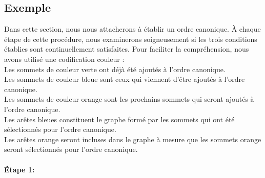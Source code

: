 \documentclass[hidelinks,letterpaper,12pt]{article}
\newcounter{Exemple} %
\begin{document}
\subsection{Exemple}
Dans cette section, nous nous attacherons à établir un ordre canonique. À chaque étape de cette procédure, nous examinerons soigneusement si les trois conditions établies sont continuellement satisfaites. Pour faciliter la compréhension, nous avons utilisé une codification couleur :
\\	
Les sommets de couleur verte ont déjà été ajoutés à l'ordre canonique.
\\
Les sommets de couleur bleue sont ceux qui viennent d'être ajoutés à l'ordre canonique.
\\
Les sommets de couleur orange sont les prochains sommets qui seront ajoutés à l'ordre canonique.
\\
Les arêtes bleues constituent le graphe formé par les sommets qui ont été sélectionnés pour l'ordre canonique.
\\
Les arêtes orange seront incluses dans le graphe à mesure que les sommets orange seront sélectionnés pour l'ordre canonique.
\\ \\
\textbf{Étape 1:}
\end{document}
